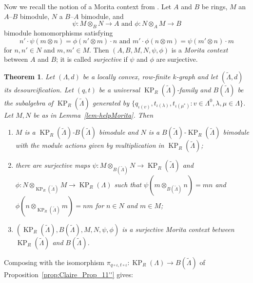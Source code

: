 \documentclass[a4paper,12pt]{amsart}
\numberwithin{equation}{section}
\newtheorem{thm}{Theorem}[section]
\theoremstyle{definition}
\theoremstyle{remark}
\begin{document}
Now we recall the notion of a  Morita context from \cite[page~41]{GS}. Let $A$ and $B$ be rings, $M$ an $A$--$B$ bimodule, $N$ a $B$--$A$ bimodule, and 
\[
     \psi:M \otimes_B N \to A \text{ and }\phi:N \otimes_A M \to B
\]
 bimodule homomorphisms satisfying
\begin{equation}\label{eq-ops}n'\cdot \psi(m \otimes n) = \phi(n' \otimes m)\cdot n \text { and } m'\cdot \phi(n \otimes m) = \psi(
m' \otimes n)\cdot m\end{equation}  for  $n,n' \in N$ and $m,m' \in M$.
Then  $(A,B,M,N,\psi, \phi)$ is a \emph{Morita context} between $A$ and $B$; it is called \emph{surjective} if $\psi$ and $\phi$ are surjective.

\begin{thm}\label{thm:m_context}
Let $(\Lambda,d)$ be a locally convex, row-finite $k$-graph and let $(\tilde{\Lambda}, d)$ its
desourcification. Let $(q,t)$ be  a universal  $\operatorname{KP}_R(\tilde{\Lambda})$-family and  $B(\tilde\Lambda)$ be the subalgebra  of $\operatorname{KP}_R(\tilde{\Lambda})$ generated by $\{q_{\iota(v)}, t_{\iota(\lambda)}, t_{\iota(\mu^*)}:v\in\Lambda^0, \lambda,\mu\in\Lambda\}$. 
Let $M, N$ be as in Lemma~\ref{lem-helpMorita}. Then
\begin{enumerate}
\item\label{item-aa}
$M$ is a $\operatorname{KP}_R({\tilde{\Lambda}})$-$B(\tilde\Lambda)$ bimodule and $N$ is a $B(\tilde\Lambda)$-$\operatorname{KP}_R({\tilde{\Lambda}})$
bimodule with the module actions given by multiplication in $\operatorname{KP}_R({\tilde{\Lambda}})$;
\item\label{item-bb} there are surjective maps
$\psi: M \otimes_{B(\tilde\Lambda)} N \to \operatorname{KP}_R(\tilde{\Lambda})$ and $\phi: N \otimes_{\operatorname{KP}_R(\tilde{\Lambda})} M \to \operatorname{KP}_R(\Lambda)$ such that  
$\psi(m \otimes_{B(\tilde\Lambda)} n ) = mn$ and $\phi(n \otimes_{\operatorname{KP}_R(\tilde{\Lambda})} m ) = nm$ for $n\in N$ and $m\in M$; 
\item\label{item-cc} $(\operatorname{KP}_R(\tilde{\Lambda}), B(\tilde\Lambda), M, N, \psi, \phi)$ is a surjective Morita context between
$\operatorname{KP}_R({\tilde{\Lambda}})$ and $B(\tilde\Lambda)$.
\end{enumerate}
\end{thm}

Composing with the isomorphism $\pi_{q \circ \iota,t \circ \iota}:\operatorname{KP}_R(\Lambda)\to B(\tilde\Lambda)$ of Proposition~\ref{prop:Claire_Prop_11''} gives: 
\end{document}
